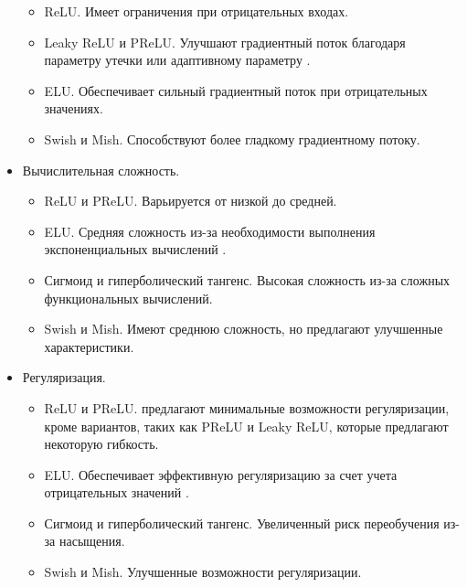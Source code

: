 \begin{itemize}[label=---]
\begin{itemize}
			\item ReLU. Имеет ограничения при отрицательных входах.
			\item Leaky ReLU и PReLU. Улучшают градиентный поток благодаря параметру утечки или адаптивному параметру \cite{mitcnnchapter}.
			\item ELU. Обеспечивает сильный градиентный поток при отрицательных значениях.
			\item Swish и Mish. Способствуют более гладкому градиентному потоку.
		\end{itemize}
	\item Вычислительная сложность.
		\begin{itemize}
			\item ReLU и PReLU. Варьируется от низкой до средней.
			\item ELU. Средняя сложность из-за необходимости выполнения экспоненциальных вычислений \cite{sparsecnn}.
			\item Сигмоид и гиперболический тангенс. Высокая сложность из-за сложных функциональных вычислений.
			\item Swish и Mish. Имеют среднюю сложность, но предлагают улучшенные характеристики.
		\end{itemize}
	\item Регуляризация.
		\begin{itemize}
			\item ReLU и PReLU. предлагают минимальные возможности регуляризации, кроме вариантов, таких как PReLU и Leaky ReLU, которые предлагают некоторую гибкость.
			\item ELU. Обеспечивает эффективную регуляризацию за счет учета отрицательных значений \cite{fullycnnstruct}.
			\item Сигмоид и гиперболический тангенс. Увеличенный риск переобучения из-за насыщения.
			\item Swish и Mish. Улучшенные возможности регуляризации.
		\end{itemize}
\end{itemize}


